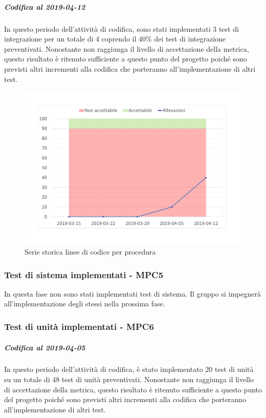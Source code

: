 \subparagraph{Codifica al 2019-04-12}
In questo periodo dell'attività di codifica, sono stati implementati 3 test di integrazione per un totale di 4 coprendo il 40\% dei test di integrazione preventivati.
Nonostante non raggiunga il livello di accettazione della
metrica, questo risultato è ritenuto sufficiente a questo punto del progetto poiché sono previsti altri incrementi alla codifica che porteranno all'implementazione di altri test.
\begin{figure}[H]
	\centering
	\includegraphics[scale=0.6]{images/resoconto/MPC4Chart.pdf}
	\caption{Serie storica linee di codice per procedura}	
\end{figure}

\subsubsection{Test di sistema implementati - MPC5}
In questa fase non sono stati implementati test di sistema.
Il gruppo si impegnerà all'implementazione degli stessi nella prossima fase.

\subsubsection{Test di unità implementati - MPC6}
\subparagraph{Codifica al 2019-04-05}
In questo periodo dell'attività di codifica, è stato implementato 20 test di unità su un totale di 48 test di unità preventivati.
Nonostante non raggiunga il livello di accettazione della
metrica, questo risultato è ritenuto sufficiente a questo punto del progetto poiché sono previsti altri incrementi alla codifica che porteranno all'implementazione di altri test.

